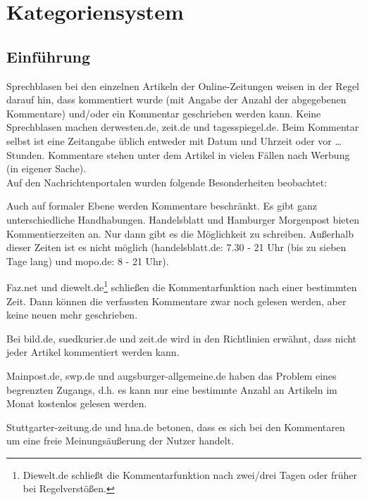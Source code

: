 \chapter{Kategoriensystem}


\section{Einführung}

Sprechblasen bei den einzelnen Artikeln der Online-Zeitungen weisen in der Regel darauf hin, dass kommentiert wurde
(mit Angabe der Anzahl der abgegebenen Kommentare) und/oder ein Kommentar
geschrieben werden kann. Keine Sprechblasen machen derwesten.de, zeit.de und tagesspiegel.de.
Beim Kommentar selbst ist eine Zeitangabe üblich
entweder mit Datum und Uhrzeit oder \glqq vor \ldots Stunden\grqq.  Kommentare
stehen unter dem Artikel in vielen Fällen nach Werbung (in eigener Sache).\\

Auf den Nachrichtenportalen wurden folgende Besonderheiten beobachtet:

Auch auf formaler Ebene werden Kommentare beschränkt. Es gibt ganz
unterschiedliche Handhabungen. Handelsblatt und Hamburger Morgenpost bieten Kommentierzeiten an. 
Nur dann gibt es die Möglichkeit zu schreiben. Außerhalb dieser Zeiten ist es nicht
möglich (handelsblatt.de: 7.30 - 21 Uhr (bis zu sieben Tage lang) und mopo.de: 8 - 21 Uhr).

Faz.net und diewelt.de\footnote{Diewelt.de schließt die Kommentarfunktion nach zwei/drei Tagen oder früher bei
  Regelverstößen.} schließen die Kommentarfunktion nach einer bestimmten
Zeit. Dann können die verfassten Kommentare zwar noch gelesen werden, aber keine
neuen mehr geschrieben. 

Bei  bild.de, suedkurier.de und zeit.de wird in den Richtlinien erwähnt, dass nicht jeder Artikel
kommentiert werden kann.

Mainpost.de, swp.de und augsburger-allgemeine.de haben das Problem eines begrenzten
Zugangs, d.h. es kann nur eine bestimmte Anzahl an Artikeln im Monat kostenlos gelesen werden. 

Stuttgarter-zeitung.de und hna.de betonen, dass es sich bei den Kommentaren um eine freie 
Meinungsäußerung der Nutzer handelt. 

